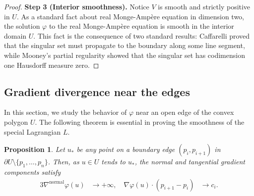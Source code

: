 \documentclass[11pt]{article}
\newtheorem{proposition}{Proposition}
\begin{document}
\begin{proof}
\textbf{Step 3 (Interior smoothness).} 
Notice $V$ is smooth and strictly positive in $U$.
As a standard fact about real Monge-Amp\`ere equation in dimension two, the solution $\varphi$ to the real Monge-Amp\`ere equation is smooth in the interior domain $U$. This fact is the consequence of two standard results: Caffarelli \cite{MR1038359} proved that the singular set must propagate to the boundary along some line segment, while Mooney's partial regularity \cite{MR3340380} showed that the singular set has codimension one Hausdorff measure zero. 
\end{proof}





\subsection{Gradient divergence near the edges}


In this section, we study the behavior of $\varphi$ near an open edge of the convex polygon $U$. The following theorem is essential in proving the smoothness of the special Lagrangian $L$.


\begin{proposition}\label{prop:gradientdivergence}
\label{blowup}
Let $u_*$ be any point on a boundary edge $(p_i, p_{i+1})$ in $\partial U\setminus \{ p_1,\ldots, p_n\}$. Then, as $u\in U$ tends to $u_*$, the normal and tangential gradient components satisfy
\begin{alignat*}{3}
        \nabla^{\text{normal}} \varphi (u) &\to +\infty, 
        \quad
         \nabla \varphi (u)\cdot (p_{i+1}-p_i) &\to c_i.
\end{alignat*}
\end{proposition}
\end{document}

